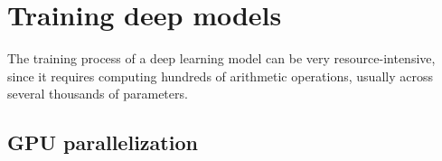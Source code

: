 \section{Training deep models}

The training process of a deep learning model can be very resource-intensive, since it requires computing hundreds of arithmetic operations, usually across several thousands of parameters. 

\subsection{GPU parallelization}

